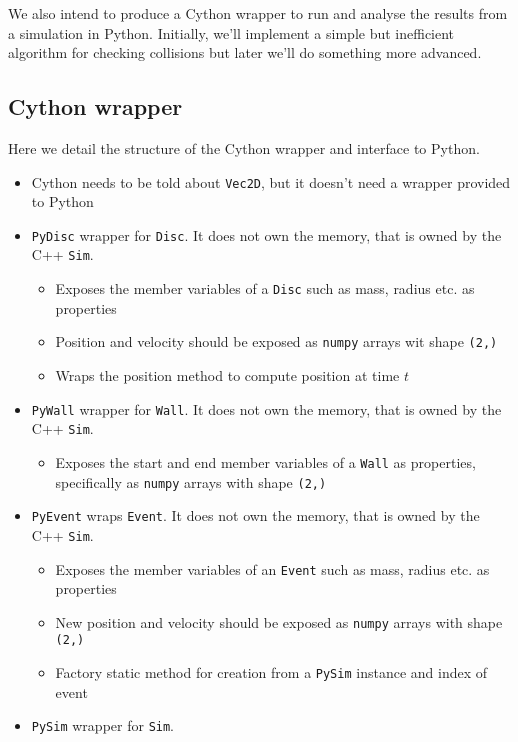 \documentclass{article}
\begin{document}
We also intend to produce a Cython wrapper to run and analyse the results from a simulation in Python. Initially, we'll implement a simple but inefficient algorithm for checking collisions but later we'll do something more advanced.

\subsection{Cython wrapper}
Here we detail the structure of the Cython wrapper and interface to Python.
\begin{itemize}
    \item Cython needs to be told about \texttt{Vec2D}, but it doesn't need a wrapper provided to Python
    \item \texttt{PyDisc} wrapper for \texttt{Disc}. It does not own the memory, that is owned by the C++ \texttt{Sim}.
    \begin{itemize}
        \item Exposes the member variables of a \texttt{Disc} such as mass, radius etc. as properties
        \item Position and velocity should be exposed as \texttt{numpy} arrays wit shape \texttt{(2,)}
        \item Wraps the position method to compute position at time $t$
    \end{itemize}
    \item \texttt{PyWall} wrapper for \texttt{Wall}. It does not own the memory, that is owned by the C++ \texttt{Sim}.
    \begin{itemize}
        \item Exposes the start and end member variables of a \texttt{Wall} as properties, specifically as \texttt{numpy} arrays with shape \texttt{(2,)}
    \end{itemize}
    \item \texttt{PyEvent} wraps \texttt{Event}. It does not own the memory, that is owned by the C++ \texttt{Sim}.
    \begin{itemize}
        \item Exposes the member variables of an \texttt{Event} such as mass, radius etc. as properties
        \item New position and velocity should be exposed as \texttt{numpy} arrays with shape \texttt{(2,)}
        \item Factory static method for creation from a \texttt{PySim} instance and index of event
    \end{itemize}
    \item \texttt{PySim} wrapper for \texttt{Sim}.

\end{itemize}
\end{document}
